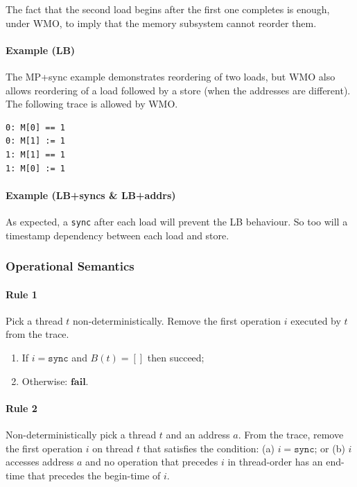 \documentclass[11pt]{article}
\begin{document}
\noindent The fact that the second load begins after the first one
completes is enough, under WMO, to imply that the memory subsystem
cannot reorder them.

\paragraph{Example (LB)} The MP+sync example demonstrates reordering
of two loads, but WMO also allows reordering of a load followed by a
store (when the addresses are different).  The following trace is
allowed by WMO.

\begin{verbatim}
0: M[0] == 1
0: M[1] := 1
1: M[1] == 1
1: M[0] := 1
\end{verbatim}

\paragraph{Example (LB+syncs \& LB+addrs)} As expected, a \verb!sync!
after each load will prevent the LB behaviour.  So too will a
timestamp dependency between each load and store.

\subsubsection*{Operational Semantics}

\paragraph{Rule 1} 

Pick a thread $t$ non-deterministically.  Remove the first operation
$i$ executed by $t$ from the trace.

\begin{enumerate}
\item
     If $i = \texttt{sync}$ and $B(t) = []$ then succeed;
\item
     Otherwise: $\textbf{fail}$.
\end{enumerate}

\paragraph{Rule 2}

Non-deterministically pick a thread $t$ and an address $a$.  From the
trace, remove the first operation $i$ on thread $t$ that satisfies the
condition: (a) $i = \texttt{sync}$; or (b) $i$ accesses address $a$
and no operation that precedes $i$ in thread-order has an end-time
that precedes the begin-time of $i$.
\end{document}
